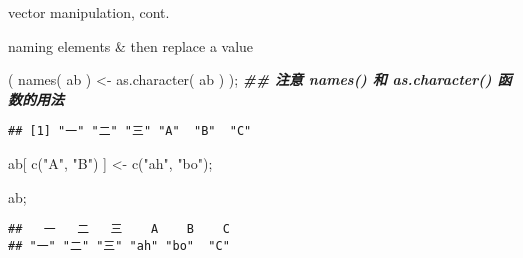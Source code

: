 \documentclass[ignorenonframetext,]{beamer}
\newenvironment{Shaded}{\begin{snugshade}}{\end{snugshade}}
\newcommand{\DocumentationTok}[1]{\textcolor[rgb]{0.56,0.35,0.01}{\textbf{\textit{#1}}}}
\newcommand{\FunctionTok}[1]{\textcolor[rgb]{0.00,0.00,0.00}{#1}}
\newcommand{\NormalTok}[1]{#1}
\newcommand{\OtherTok}[1]{\textcolor[rgb]{0.56,0.35,0.01}{#1}}
\newcommand{\StringTok}[1]{\textcolor[rgb]{0.31,0.60,0.02}{#1}}
\newcommand\FontSmall{\fontsize{7}{8}\selectfont}
\begin{document}
\begin{frame}[fragile]{vector manipulation, cont.}
\protect\hypertarget{vector-manipulation-cont.-2}{}
\begin{block}{naming elements \& then replace a value}
\protect\hypertarget{naming-elements-then-replace-a-value}{}
\FontSmall

\begin{Shaded}
\begin{Highlighting}[]
\NormalTok{( }\FunctionTok{names}\NormalTok{( ab ) }\OtherTok{\textless{}{-}} \FunctionTok{as.character}\NormalTok{( ab ) ); }\DocumentationTok{\#\# 注意 names() 和 as.character() 函数的用法}
\end{Highlighting}
\end{Shaded}

\begin{verbatim}
## [1] "一" "二" "三" "A"  "B"  "C"
\end{verbatim}

\begin{Shaded}
\begin{Highlighting}[]
\NormalTok{ab[ }\FunctionTok{c}\NormalTok{(}\StringTok{"A"}\NormalTok{, }\StringTok{"B"}\NormalTok{) ] }\OtherTok{\textless{}{-}} \FunctionTok{c}\NormalTok{(}\StringTok{"ah"}\NormalTok{, }\StringTok{"bo"}\NormalTok{);}

\NormalTok{ab;}
\end{Highlighting}
\end{Shaded}

\begin{verbatim}
##   一   二   三    A    B    C 
## "一" "二" "三" "ah" "bo"  "C"
\end{verbatim}
\end{block}
\end{frame}
\end{document}
